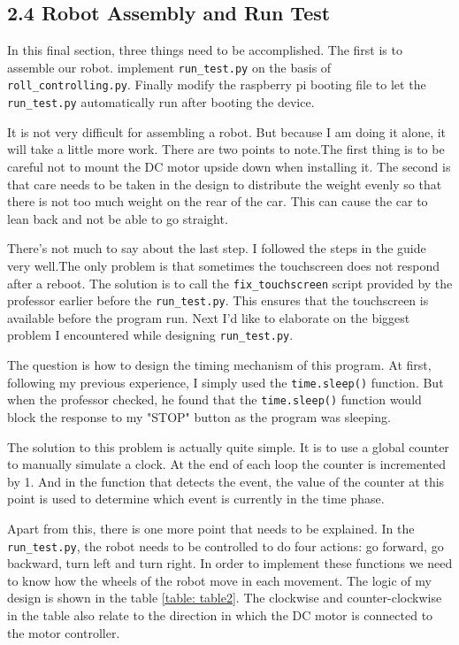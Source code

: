 \documentclass[12pt]{report}
\newcommand{\code}[1]{\colorbox{light-gray}{\texttt{#1}}}
\begin{document}
\subsection*{2.4 Robot Assembly and Run Test}\vspace{-1em}
In this final section, three things need to be accomplished. The first is to assemble our robot. implement \code{run\_test.py} on the basis of \code{roll\_controlling.py}. Finally modify the raspberry pi booting file to let the \code{run\_test.py} automatically run after booting the device.\par
It is not very difficult for assembling a robot. But because I am doing it alone, it will take a little more work. There are two points to note.The first thing is to be careful not to mount the DC motor upside down when installing it. The second is that care needs to be taken in the design to distribute the weight evenly so that there is not too much weight on the rear of the car. This can cause the car to lean back and not be able to go straight.\par
There's not much to say about the last step. I followed the steps in the guide very well.The only problem is that sometimes the touchscreen does not respond after a reboot. The solution is to call the \code{fix\_touchscreen} script provided by the professor earlier before the \code{run\_test.py}. This ensures that the touchscreen is available before the program run. Next I'd like to elaborate on the biggest problem I encountered while designing \code{run\_test.py}.\par
The question is how to design the timing mechanism of this program. At first, following my previous experience, I simply used the \code{time.sleep()} function. But when the professor checked, he found that the \code{time.sleep()} function would block the response to my "STOP" button as the program was sleeping.\par
The solution to this problem is actually quite simple. It is to use a global counter to manually simulate a clock. At the end of each loop the counter is incremented by 1. And in the function that detects the event, the value of the counter at this point is used to determine which event is currently in the time phase.\par
Apart from this, there is one more point that needs to be explained. In the \code{run\_test.py}, the robot needs to be controlled to do four actions: go forward, go backward, turn left and turn right. In order to implement these functions we need to know how the wheels of the robot move in each movement. The logic of my design is shown in the table \ref{table: table2}. The clockwise and counter-clockwise in the table also relate to the direction in which the DC motor is connected to the motor controller. \par
\end{document}
